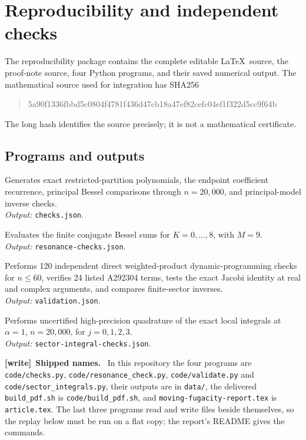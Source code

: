 \documentclass[11pt,letterpaper]{article}
\newenvironment{writenote}[1][]{\par\smallskip\begingroup\small
 \noindent\textbf{[write]}\if\relax\detokenize{#1}\relax\else~\textbf{#1.}\fi\ }%
 {\par\endgroup\smallskip}
\begin{document}
\clearpage
\appendix
\section{Reproducibility and independent checks}
The reproducibility package contains the complete editable \LaTeX\ source, the proof-note source, four Python programs, and their saved numerical output. The mathematical source used for integration has SHA256
\begin{quote}\small\ttfamily
5a90f1336fbbd5c0804f4781f436d47cb18a47ef82cefc04ef1f322d5cc9f64b
\end{quote}
The long hash identifies the source precisely; it is not a mathematical certificate.

\subsection{Programs and outputs}
\begin{description}[style=nextline,leftmargin=1em,labelindent=0pt,labelwidth=0pt]
\item[\texttt{checks.py}] Generates exact restricted-partition polynomials, the endpoint coefficient recurrence, principal Bessel comparisons through $n=20{,}000$, and principal-model inverse checks. \\\emph{Output: }\texttt{checks.json}.
\item[\texttt{resonance\_check.py}] Evaluates the finite conjugate Bessel sums for $K=0,\ldots,8$, with $M=9$. \\\emph{Output: }\texttt{resonance-checks.json}.
\item[\texttt{validate.py}] Performs 120 independent direct weighted-product dynamic-programming checks for $n\le60$, verifies 24 listed A292304 terms, tests the exact Jacobi identity at real and complex arguments, and compares finite-sector inverses. \\\emph{Output: }\texttt{validation.json}.
\item[\texttt{sector\_integrals.py}] Performs uncertified high-precision quadrature of the exact local integrals at $\alpha=1$, $n=20{,}000$, for $j=0,1,2,3$. \\\emph{Output: }\texttt{sector-integral-checks.json}.
\end{description}

\begin{writenote}[Shipped names]
In this repository the four programs are \nolinkurl{code/checks.py},
\nolinkurl{code/resonance_check.py}, \nolinkurl{code/validate.py} and
\nolinkurl{code/sector_integrals.py}, their outputs are in
\nolinkurl{data/}, the delivered \nolinkurl{build_pdf.sh} is
\nolinkurl{code/build_pdf.sh}, and \nolinkurl{moving-fugacity-report.tex} is
\nolinkurl{article.tex}. The last three programs read and write files
beside themselves, so the replay below must be run on a flat copy; the
report's README gives the commands.
\end{writenote}
\end{document}
